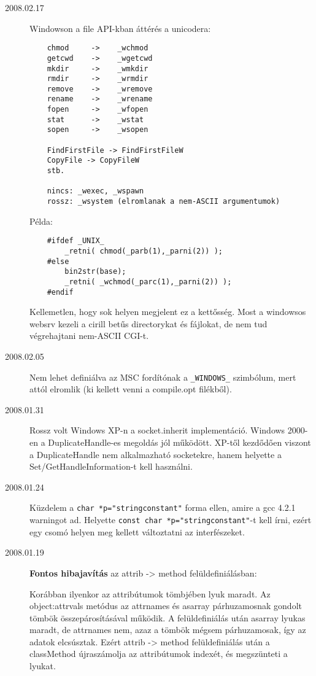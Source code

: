 \begin{description}
\item[2008.02.17]
  Windowson a file API-kban áttérés a unicodera:
\begin{verbatim}
    chmod     ->    _wchmod  
    getcwd    ->    _wgetcwd 
    mkdir     ->    _wmkdir  
    rmdir     ->    _wrmdir  
    remove    ->    _wremove 
    rename    ->    _wrename 
    fopen     ->    _wfopen  
    stat      ->    _wstat   
    sopen     ->    _wsopen  

    FindFirstFile -> FindFirstFileW
    CopyFile -> CopyFileW
    stb.
      
    nincs: _wexec, _wspawn 
    rossz: _wsystem (elromlanak a nem-ASCII argumentumok)
\end{verbatim}
    
  Példa:

\begin{verbatim}
    #ifdef _UNIX_
        _retni( chmod(_parb(1),_parni(2)) );
    #else
        bin2str(base);
        _retni( _wchmod(_parc(1),_parni(2)) );
    #endif
\end{verbatim}

  Kellemetlen, hogy sok helyen megjelent ez a kettősség.
  Most a windowsos websrv kezeli a cirill betűs directorykat
  és fájlokat, de nem tud végrehajtani nem-ASCII CGI-t.

\item[2008.02.05]
  Nem lehet definiálva az MSC fordítónak a \verb!_WINDOWS_! szimbólum, 
  mert attól elromlik (ki kellett venni a compile.opt filékből).

\item[2008.01.31]
  Rossz volt Windows XP-n a socket.inherit implementáció.
  Windows 2000-en a DuplicateHandle-es megoldás jól működött.
  XP-től kezdődően viszont a DuplicateHandle nem alkalmazható socketekre,
  hanem helyette a Set/GetHandleInformation-t kell használni.

\item[2008.01.24]
  Küzdelem a \verb!char *p="stringconstant"! forma ellen,
  amire a gcc 4.2.1 warningot ad.
  Helyette \verb!const char *p="stringconstant"!-t kell írni,
  ezért egy csomó helyen meg kellett változtatni az interfészeket.

\item[2008.01.19]
  {\bf Fontos hibajavítás} az attrib -> method felüldefiniálásban:

  Korábban ilyenkor az attribútumok tömbjében lyuk maradt. 
  Az  object:attrvals metódus az attrnames és asarray
  párhuzamosnak gondolt tömbök összepárosításával működik.
  A felüldefiniálás után asarray lyukas maradt, de attrnames nem,
  azaz a tömbök mégsem párhuzamosak, így az adatok elcsúsztak.
  Ezért attrib -> method felüldefiniálás után a classMethod
  újraszámolja az attribútumok indexét, és megszünteti a lyukat.
 

\end{description}
